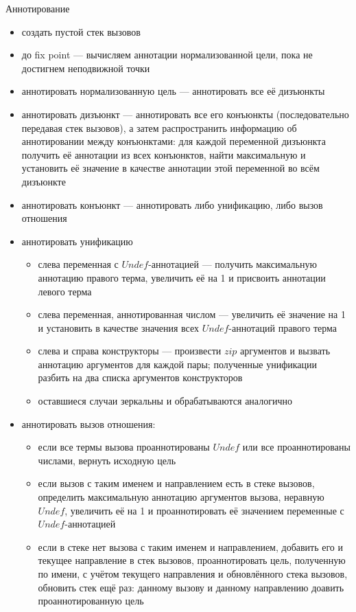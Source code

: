 \documentclass[conference,american,russian]{IEEEtran}
\begin{document}
Аннотирование
\begin{itemize}
    \item создать пустой стек вызовов
    \item до fix point --- вычисляем аннотации нормализованной цели, пока не достигнем неподвижной точки
    \item аннотировать нормализованную цель --- аннотировать все её дизъюнкты
    \item аннотировать дизъюнкт --- аннотировать все его конъюнкты (последовательно передавая стек вызовов), а затем распространить информацию об аннотировании между конъюнктами: для каждой переменной дизъюнкта получить её аннотации из всех конъюнктов, найти максимальную и установить её значение в качестве аннотации этой переменной во всём дизъюнкте
    \item аннотировать конъюнкт --- аннотировать либо унификацию, либо вызов отношения
    \item аннотировать унификацию
    \begin{itemize}
        \item слева переменная с $Undef$-аннотацией --- получить максимальную аннотацию правого терма, увеличить её на 1 и присвоить аннотации левого терма
        \item слева переменная, аннотированная числом --- увеличить её значение на 1 и установить в качестве значения всех $Undef$-аннотаций правого терма
        \item слева и справа конструкторы --- произвести $zip$ аргументов и вызвать аннотацию аргументов для каждой пары; полученные унификации разбить на два списка аргументов конструкторов
        \item оставшиеся случаи зеркальны и обрабатываются аналогично
    \end{itemize}
    \item аннотировать вызов отношения:
    \begin{itemize}
        \item если все термы вызова проаннотированы $Undef$ или все проаннотированы числами, вернуть исходную цель
        \item если вызов с таким именем и направлением есть в стеке вызовов, определить максимальную аннотацию аргументов вызова, неравную $Undef$, увеличить её на 1 и проаннотировать её значением переменные с $Undef$-аннотацией
        \item если в стеке нет вызова с таким именем и направлением, добавить его и текущее направление в стек вызовов, проаннотировать цель, полученную по имени, с учётом текущего направления и обновлённого стека вызовов, обновить стек ещё раз: данному вызову и данному направлению доавить проаннотированную цель
    \end{itemize}
\end{itemize}
\end{document}
